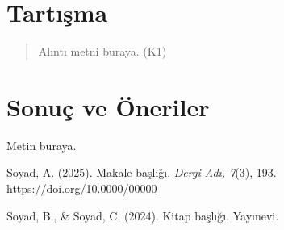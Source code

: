 \documentclass[ornament=alternate,fontsize=11,lang=turkish]{sosa}
\begin{document}
\section{Tartışma}

\begin{quote}
Alıntı metni buraya. (K1)
\end{quote}

\section{Sonuç ve Öneriler}

Metin buraya.

\begin{sosareferences}

Soyad, A. (2025). Makale başlığı. \textit{Dergi Adı, 7}(3), 193.
\url{https://doi.org/10.0000/00000}

Soyad, B., \& Soyad, C. (2024). Kitap başlığı. Yayınevi.

\end{sosareferences}
\end{document}
